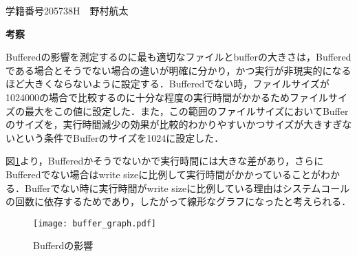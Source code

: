 \documentclass[a4paper,11pt]{jsarticle}
\begin{document}
学籍番号205738H　野村航太

\textbf{考察}

Bufferedの影響を測定するのに最も適切なファイルとbufferの大きさは，Bufferedである場合とそうでない場合の違いが明確に分かり，かつ実行が非現実的になるほど大きくならないように設定する．Bufferedでない時，ファイルサイズが1024000の場合で比較するのに十分な程度の実行時間がかかるためファイルサイズの最大をこの値に設定した．また，この範囲のファイルサイズにおいてBufferのサイズを，実行時間減少の効果が比較的わかりやすいかつサイズが大きすぎないという条件でBufferのサイズを1024に設定した．

図\ref{fig1}より，Bufferedかそうでないかで実行時間には大きな差があり，さらにBufferedでない場合はwrite sizeに比例して実行時間がかかっていることがわかる．Bufferでない時に実行時間がwrite sizeに比例している理由はシステムコールの回数に依存するためであり，したがって線形なグラフになったと考えられる．

\begin{figure}[H]
\centering
\texttt{[image: buffer\_graph.pdf]}
\caption{Bufferdの影響}\label{fig1}
\end{figure}
\end{document}
